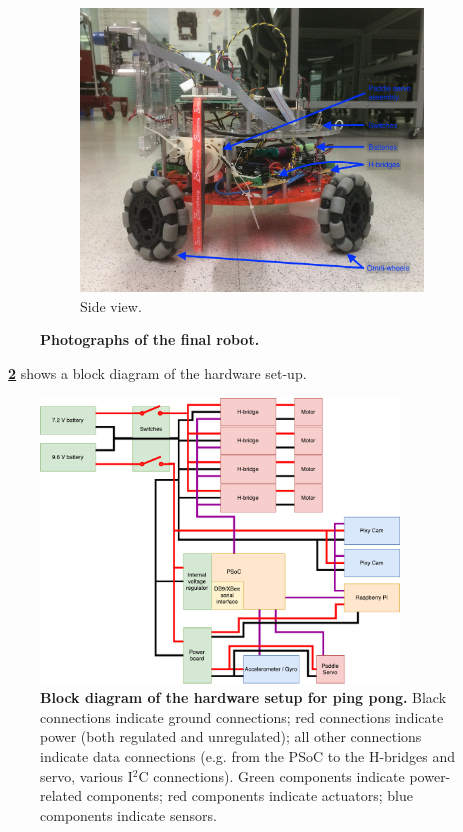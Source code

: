 \documentclass[letterpaper, 11pt]{article}
\newcommand*{\figref}[1]{\textbf{\figurename~\ref{#1}}}
\newcommand{\iic}{I$^2$C\xspace}
\begin{document}
\begin{enumerate}[label=\textbf{\arabic*.}]
\begin{figure}[H]
    \begin{subfigure}[t]{0.8\textwidth}
        \includegraphics[width=\textwidth]{images/left.JPG}
        \caption{Side view.}
    \end{subfigure}
    \caption{\textbf{Photographs of the final robot.}}
    \label{fig:pics}
\end{figure}

\figref{fig:blockdiagram} shows a block diagram of the hardware set-up.
\begin{figure}[ht]
    \centering
    \includegraphics[width=0.85\textwidth]{images/BlockDiagram.pdf}
    \caption{\textbf{Block diagram of the hardware setup for ping pong.} Black connections indicate ground connections; red connections indicate power (both regulated and unregulated); all other connections indicate data connections (e.g. from the PSoC to the H-bridges and servo, various \iic connections). Green components indicate power-related components; red components indicate actuators; blue components indicate sensors.}
    \label{fig:blockdiagram}
\end{figure}


\end{enumerate}
\end{document}
